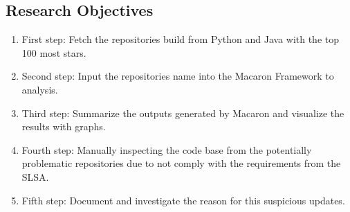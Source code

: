 \subsection{Research Objectives}
\begin{enumerate}
    \item First step: Fetch the repositories build from Python and Java with the top 100 most stars.
    \item Second step: Input the repositories name into the Macaron Framework to analysis. 
    \item Third step: Summarize the outputs generated by Macaron and visualize the results with graphs.
    \item Fourth step: Manually inspecting the code base from the potentially problematic repositories 
    due to not comply with the requirements from the SLSA.
    \item Fifth step: Document and investigate the reason for this suspicious updates.  
\end{enumerate}
